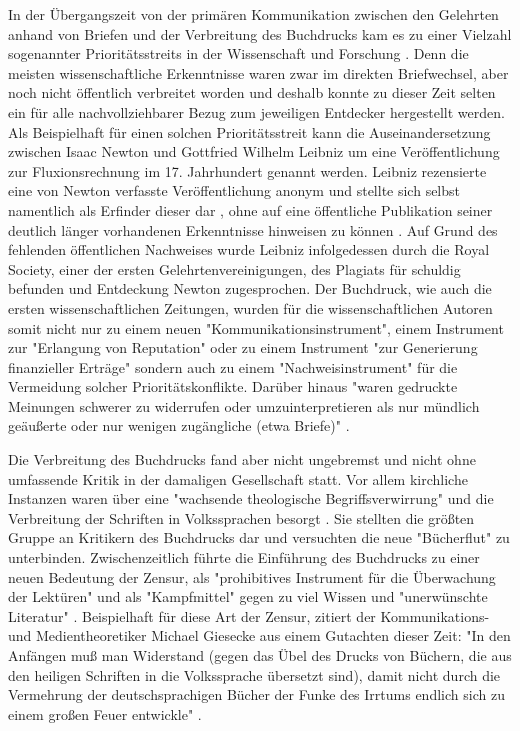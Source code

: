 In der Übergangszeit von der primären Kommunikation zwischen den Gelehrten anhand von Briefen und der Verbreitung des Buchdrucks kam es zu einer Vielzahl sogenannter Prioritätsstreits in der Wissenschaft und Forschung \cite{schirmbacher_2009_wisspub}. Denn die meisten wissenschaftliche Erkenntnisse waren zwar im direkten Briefwechsel, aber noch nicht öffentlich verbreitet worden und deshalb konnte zu dieser Zeit selten ein für alle nachvollziehbarer Bezug zum jeweiligen Entdecker hergestellt werden. Als Beispielhaft für einen solchen Prioritätsstreit kann die Auseinandersetzung zwischen Isaac Newton und Gottfried Wilhelm Leibniz um eine Veröffentlichung zur Fluxionsrechnung im 17. Jahrhundert genannt werden. Leibniz rezensierte eine von Newton verfasste Veröffentlichung anonym und stellte sich selbst namentlich als Erfinder dieser dar \cite{2013_leibniz}, ohne auf eine öffentliche Publikation seiner deutlich länger vorhandenen Erkenntnisse hinweisen zu können \cite{schirmbacher_2009_wisspub}. Auf Grund des fehlenden öffentlichen Nachweises wurde Leibniz infolgedessen durch die Royal Society, einer der ersten Gelehrtenvereinigungen, des Plagiats für schuldig befunden und Entdeckung Newton zugesprochen. Der Buchdruck, wie auch die ersten wissenschaftlichen Zeitungen, wurden für die wissenschaftlichen Autoren somit nicht nur zu einem neuen "Kommunikationsinstrument", einem Instrument zur "Erlangung von Reputation" oder zu einem Instrument "zur Generierung finanzieller Erträge" sondern auch zu einem "Nachweisinstrument" \cite{wunderlich_2008_buchdruck} \cite{schirmbacher_2009_wisspub} für die Vermeidung solcher Prioritätskonflikte. Darüber hinaus "waren gedruckte Meinungen schwerer zu widerrufen oder umzuinterpretieren als nur mündlich geäußerte oder nur wenigen zugängliche (etwa Briefe)" \cite{luhmann_1997_gesellschaft}.

Die Verbreitung des Buchdrucks fand aber nicht ungebremst und nicht ohne umfassende Kritik in der damaligen Gesellschaft statt. Vor allem kirchliche Instanzen waren über eine "wachsende theologische Begriffsverwirrung" und die Verbreitung der Schriften in Volkssprachen besorgt \cite{giesecke_1991_buchdruck}. Sie stellten die größten Gruppe an Kritikern des Buchdrucks dar und versuchten die neue "Bücherflut" zu unterbinden\cite{giesecke_1991_buchdruck}. Zwischenzeitlich führte die Einführung des Buchdrucks zu einer neuen Bedeutung der Zensur, als "prohibitives Instrument für die Überwachung der Lektüren" und als "Kampfmittel" \cite{sprachgeschichte_1998_besch} gegen zu viel Wissen \cite{suchen} und "unerwünschte Literatur" \cite{suchen}. Beispielhaft für diese Art der Zensur, zitiert der Kommunikations- und Medientheoretiker Michael Giesecke aus einem Gutachten dieser Zeit: "In den Anfängen muß man Widerstand (gegen das Übel des Drucks von Büchern, die aus den heiligen Schriften in die Volkssprache übersetzt sind), damit nicht durch die Vermehrung der deutschsprachigen Bücher der Funke des Irrtums endlich sich zu einem großen Feuer entwickle" \cite{giesecke_1991_buchdruck}.

